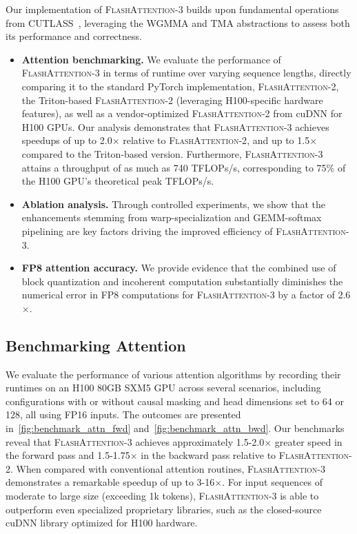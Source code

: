 Our implementation of \textsc{FlashAttention-3} builds upon fundamental operations from CUTLASS~\citep{Thakkar_CUTLASS_2023}, leveraging the WGMMA and TMA abstractions to assess both its performance and correctness.

\begin{itemize}

\item \textbf{Attention benchmarking.} We evaluate the performance of \textsc{FlashAttention-3} in terms of runtime over varying sequence lengths, directly comparing it to the standard PyTorch implementation, \textsc{FlashAttention-2}, the Triton-based \textsc{FlashAttention-2} (leveraging H100-specific hardware features), as well as a vendor-optimized \textsc{FlashAttention-2} from cuDNN for H100 GPUs. Our analysis demonstrates that \textsc{FlashAttention-3} achieves speedups of up to 2.0$\times$ relative to \textsc{FlashAttention-2}, and up to 1.5$\times$ compared to the Triton-based version. Furthermore, \textsc{FlashAttention-3} attains a throughput of as much as 740 TFLOPs/s, corresponding to 75\% of the H100 GPU’s theoretical peak TFLOPs/s.
\item \textbf{Ablation analysis.} Through controlled experiments, we show that the enhancements stemming from warp-specialization and GEMM-softmax pipelining are key factors driving the improved efficiency of \textsc{FlashAttention-3}.
\item \textbf{FP8 attention accuracy.} We provide evidence that the combined use of block quantization and incoherent computation substantially diminishes the numerical error in FP8 computations for \textsc{FlashAttention-3} by a factor of 2.6$\times$.
\end{itemize}

\subsection{Benchmarking Attention}
\label{subsec:benchmark_attn}

We evaluate the performance of various attention algorithms by recording their runtimes on an H100 80GB SXM5 GPU across several scenarios, including configurations with or without causal masking and head dimensions set to 64 or 128, all using FP16 inputs. The outcomes are presented in~\cref{fig:benchmark_attn_fwd} and~\cref{fig:benchmark_attn_bwd}. Our benchmarks reveal that \textsc{FlashAttention-3} achieves approximately 1.5-2.0$\times$ greater speed in the forward pass and 1.5-1.75$\times$ in the backward pass relative to \textsc{FlashAttention-2}. When compared with conventional attention routines, \textsc{FlashAttention-3} demonstrates a remarkable speedup of up to 3-16$\times$. For input sequences of moderate to large size (exceeding 1k tokens), \textsc{FlashAttention-3} is able to outperform even specialized proprietary libraries, such as the closed-source cuDNN library optimized for H100 hardware.

